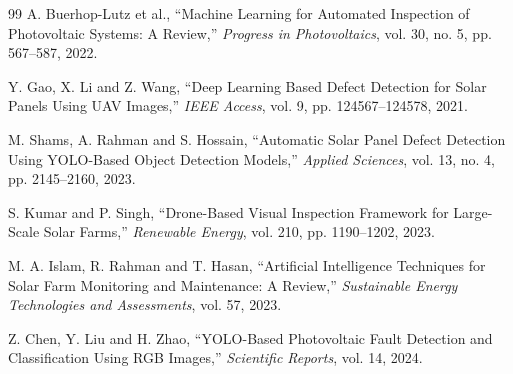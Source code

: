 \begin{thebibliography}{99}
A. Buerhop-Lutz et al.,
``Machine Learning for Automated Inspection of Photovoltaic Systems: A Review,''
\textit{Progress in Photovoltaics},
vol. 30, no. 5, pp. 567--587, 2022.

Y. Gao, X. Li and Z. Wang,
``Deep Learning Based Defect Detection for Solar Panels Using UAV Images,''
\textit{IEEE Access},
vol. 9, pp. 124567--124578, 2021.

M. Shams, A. Rahman and S. Hossain,
``Automatic Solar Panel Defect Detection Using YOLO-Based Object Detection Models,''
\textit{Applied Sciences},
vol. 13, no. 4, pp. 2145--2160, 2023.

S. Kumar and P. Singh,
``Drone-Based Visual Inspection Framework for Large-Scale Solar Farms,''
\textit{Renewable Energy},
vol. 210, pp. 1190--1202, 2023.

M. A. Islam, R. Rahman and T. Hasan,
``Artificial Intelligence Techniques for Solar Farm Monitoring and Maintenance: A Review,''
\textit{Sustainable Energy Technologies and Assessments},
vol. 57, 2023.

Z. Chen, Y. Liu and H. Zhao,
``YOLO-Based Photovoltaic Fault Detection and Classification Using RGB Images,''
\textit{Scientific Reports},
vol. 14, 2024.

\end{thebibliography}
